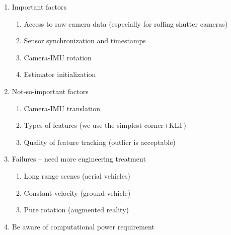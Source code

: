 \documentclass[12pt,a4paper]{article}
\begin{document}
\begin{enumerate}
\item Important factors
  \begin{enumerate}
  \item Access to raw camera data (especially for rolling shutter cameras)
  \item Sensor synchronization and timestamps
  \item Camera-IMU rotation
  \item Estimator initialization
  \end{enumerate}
\item Not-so-important factors
  \begin{enumerate}
  \item Camera-IMU translation
  \item Types of features (we use the simplest corner+KLT)
  \item Quality of feature tracking (outlier is acceptable)
  \end{enumerate}
\item Failures – need more engineering treatment
  \begin{enumerate}
  \item Long range scenes (aerial vehicles)
  \item Constant velocity (ground vehicle)
  \item Pure rotation (augmented reality)
  \end{enumerate}
\item Be aware of computational power requirement
\end{enumerate}



\printindex
\end{document}

